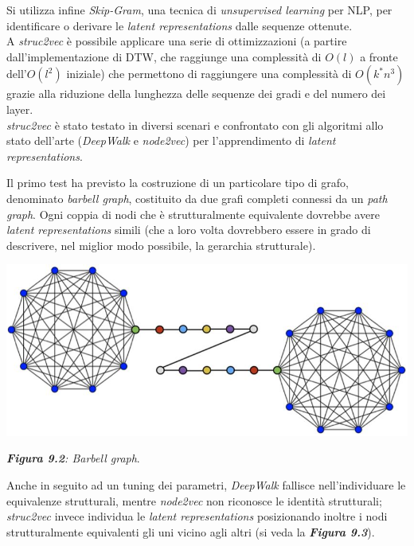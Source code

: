 \documentclass[11pt]{article}
\begin{document}
Si utilizza infine \textit{Skip-Gram}, una tecnica di \textit{unsupervised learning} per NLP, per identificare o derivare le \textit{latent representations} dalle sequenze ottenute.\\

A \textit{struc2vec} è possibile applicare una serie di ottimizzazioni (a partire dall'implementazione di DTW, che raggiunge una complessità di $O(l)$ a fronte dell'$O(l^2)$ iniziale) che permettono di raggiungere una complessità di $O(k^*n^3)$ grazie alla riduzione della lunghezza delle sequenze dei gradi e del numero dei layer.\\

\textit{struc2vec} è stato testato in diversi scenari e confrontato con gli algoritmi allo stato dell'arte (\textit{DeepWalk} e \textit{node2vec}) per l'apprendimento di \textit{latent representations}.

Il primo test ha previsto la costruzione di un particolare tipo di grafo, denominato \textit{barbell graph}, costituito da due grafi completi connessi da un \textit{path graph}. Ogni coppia di nodi che è strutturalmente equivalente dovrebbe avere \textit{latent representations} simili (che a loro volta dovrebbero essere in grado di descrivere, nel miglior modo possibile, la gerarchia strutturale).

\begin{center}
\includegraphics[scale=0.6]{struc6}

\begin{small}\textit{\textbf{Figura 9.2}: Barbell graph}.\end{small}
\end{center}

Anche in seguito ad un tuning dei parametri, \textit{DeepWalk} fallisce nell'individuare le equivalenze strutturali, mentre \textit{node2vec} non riconosce le identità strutturali; \textit{struc2vec} invece individua le \textit{latent representations} posizionando inoltre i nodi strutturalmente equivalenti gli uni vicino agli altri (si veda la \textit{\textbf{Figura 9.3}}).
\end{document}
